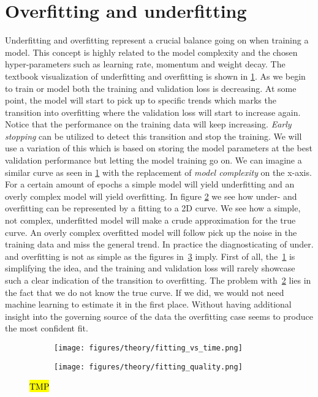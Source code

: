 \section{Overfitting and underfitting}

Underfitting and overfitting represent a crucial balance going on when training
a model. This concept is highly related to the model complexity and the chosen
hyper-parameters such as learning rate, momentum and weight decay. The textbook
visualization of underfitting and overfitting is shown in
\cref{fig:fitting_vs_time}. As we begin to train or model both the training and
validation loss is decreasing. At some point, the model will start to pick up to
specific trends which marks the transition into overfitting where the validation
loss will start to increase again. Notice that the performance on the training
data will keep increasing.  \textit{Early stopping} can be utilized to detect
this transition and stop the training. We will use a variation of this which is
based on storing the model parameters at the best validation performance but
letting the model training go on. We can imagine a similar curve as seen in
\cref{fig:fitting_vs_time} with the replacement of \textit{model complexity} on
the x-axis. For a certain amount of epochs a simple model will yield
underfitting and an overly complex model will yield overfitting. In figure
\cref{fig:fitting_quality} we see how under- and overfitting can be represented
by a fitting to a 2D curve. We see how a simple, not complex, underfitted model
will make a crude approximation for the true curve. An overly complex
overfitted model will follow pick up the noise in the training data and miss the
general trend. In practice the diagnosticating of under. and overfitting is not
as simple as the figures in~\cref{fig:over_under_fitting} imply. First of all,
the~\cref{fig:fitting_vs_time} is simplifying the idea, and the training and
validation loss will rarely showcase such a clear indication of the transition
to overfitting. The problem with~\cref{fig:fitting_quality} lies in the fact
that we do not know the true curve. If we did, we would not need machine
learning to estimate it in the first place. Without having additional insight into
the governing source of the data the overfitting case seems to produce the most
confident fit.


\begin{figure}[H]
  \centering
  \begin{subfigure}[t]{0.42\textwidth}
    \centering
    \texttt{[image: figures/theory/fitting\_vs\_time.png]}
    \caption{}
    \label{fig:fitting_vs_time}
  \end{subfigure}
  \hfill
  \begin{subfigure}[t]{0.57\textwidth}
    \centering
    \texttt{[image: figures/theory/fitting\_quality.png]}
    \caption{}
    \label{fig:fitting_quality}
  \end{subfigure}
  \hfill
  \caption{\hl{TMP}}
  \label{fig:over_under_fitting}
\end{figure}



